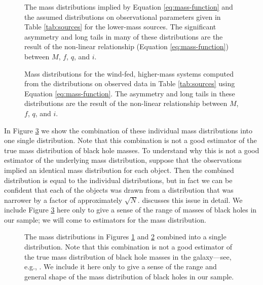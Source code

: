 \documentclass[preprint]{aastex}
\begin{document}
\begin{figure}
  \begin{center}
  \end{center}

  \caption{\label{fig:low-masses} The mass distributions implied by
    Equation \eqref{eq:mass-function} and the assumed distributions on
    observational parameters given in Table \ref{tab:sources} for the
    lower-mass sources.  The significant asymmetry and long tails in
    many of these distributions are the result of the non-linear
    relationship (Equation \eqref{eq:mass-function}) between $M$, $f$,
    $q$, and $i$.}
\end{figure}

\begin{figure}
  \begin{center}
  \end{center}
  \caption{\label{fig:high-masses} Mass distributions for the
    wind-fed, higher-mass systems computed from the distributions on
    observed data in Table \ref{tab:sources} using Equation
    \eqref{eq:mass-function}.  The asymmetry and long tails in these
    distributions are the result of the non-linear relationship
    between $M$, $f$, $q$, and $i$.}
\end{figure}

In Figure \ref{fig:masses} we show the combination of these individual
mass distributions into one single distribution.  Note that this
combination is not a good estimator of the true mass distribution of
black hole masses.  To understand why this is not a good estimator of
the underlying mass distribution, suppose that the observations
implied an identical mass distribution for each object.  Then the
combined distribution is equal to the individual distributions, but in
fact we can be confident that each of the objects was drawn from a
distribution that was narrower by a factor of approximately
$\sqrt{N}$.  \citet{Mandel2010} discusses this issue in detail.  We
include Figure \ref{fig:masses} here only to give a sense of the range
of masses of black holes in our sample; we will come to estimators for
the mass distribution.

\begin{figure}

  \caption{\label{fig:masses} The mass distributions in Figures
    \ref{fig:low-masses} and \ref{fig:high-masses} combined into a
    single distribution. Note that this combination is not a good
    estimator of the true mass distribution of black hole masses in
    the galaxy---see, e.g., \citet{Mandel2010}.  We include it here
    only to give a sense of the range and general shape of the mass
    distribution of black holes in our sample.}
\end{figure}
\end{document}
